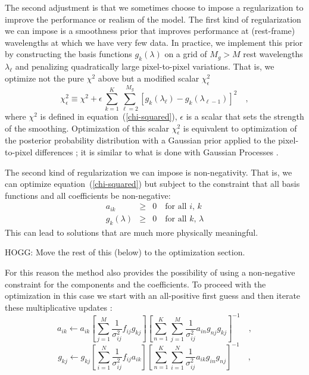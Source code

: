\documentclass[12pt,preprint]{aastex}
\newcommand{\equationname}{equation}
\begin{document}
The second adjustment is that we sometimes choose to impose a
regularization to improve the performance or realism of the model.
The first kind of regularization we can impose is a smoothness prior
that improves performance at (rest-frame) wavelengths at which we have
very few data. In practice, we implement this prior by constructing
the basis functions $g_k(\lambda)$ on a grid of $M_g>M$ rest
wavelengths $\lambda_{\ell}$ and penalizing quadratically large
pixel-to-pixel variations. That is, we optimize not the pure $\chi^2$
above but a modified scalar $\chi_{\epsilon}^2$
\begin{equation}\label{chi-epsilon}
\chi_{\epsilon}^2 \equiv \chi^2
 + \epsilon\,\sum_{k=1}^K \sum_{\ell=2}^{M_g}
 \left[g_k(\lambda_{\ell})-g_k(\lambda_{\ell-1})\right]^2
\quad ,
\end{equation}
where $\chi^2$ is defined in \equationname~(\ref{chi-squared}),
$\epsilon$ is a scalar that sets the strength of the
smoothing. Optimization of this scalar $\chi_{\epsilon}^2$ is
equivalent to optimization of the posterior probability distribution
with a Gaussian prior applied to the pixel-to-pixel differences
\citep[for example, ][]{smoothness}; it is similar to what is done
with Gaussian Processes \citep[for example, ][]{Rasmussen06a}.

The second kind of regularization we can impose is non-negativity.
That is, we can optimize \equationname~(\ref{chi-squared}) but subject
to the constraint that all basis functions and all coefficients be
non-negative:
\begin{eqnarray}\displaystyle
a_{ik} & \geq & 0 \quad\mbox{for all $i$, $k$} \nonumber\\
g_{k}(\lambda) & \geq & 0 \quad\mbox{for all $k$, $\lambda$}
\end{eqnarray}
This can lead to solutions that are much more physically meaningful.

HOGG:  Move the rest of this (below) to the optimization section.

For this reason the method also provides the possibility of using a non-negative constraint for the components and the coefficients. To proceed with the optimization in this case we start with an all-positive first guess and then iterate these multiplicative updates \citep{blanton}:
\begin{equation}\label{e6}
a_{ik} \gets a_{ik}\left[\sum_{j=1}^{M}\frac{1}{\sigma^2_{ij}}f_{ij}g_{kj}\right]\left[\sum_{n=1}^{K}\sum_{j=1}^{M}\frac{1}{\sigma^2_{ij}}a_{in}g_{nj}g_{kj}\right]^{-1}
\quad ,
\end{equation}
\begin{equation}\label{e7}
g_{kj} \gets g_{kj}\left[\sum_{i=1}^{N}\frac{1}{\sigma^2_{ij}}f_{ij}a_{ik}\right]\left[\sum_{n=1}^{K}\sum_{i=1}^{N}\frac{1}{\sigma^2_{ij}}a_{ik}g_{in}g_{nj}\right]^{-1}
\quad ,
\end{equation}
\end{document}

